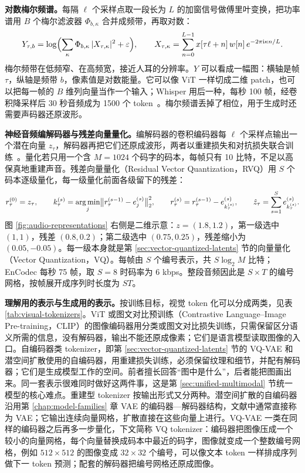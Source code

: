 \textbf{对数梅尔频谱。}每隔 \(\ell\) 个采样点取一段长为 \(L\) 的加窗信号做傅里叶变换，把功率谱用 \(B\) 个梅尔滤波器 \(\Phi_{b,\kappa}\) 合并成频带，再取对数：
\begin{equation}
 Y_{\tau,b}=\log\Bigl(\sum_{\kappa}\Phi_{b,\kappa}\,|X_{\tau,\kappa}|^2+\varepsilon\Bigr),
 \qquad
 X_{\tau,\kappa}=\sum_{n=0}^{L-1}x[\tau\ell+n]\,w[n]\,e^{-2\pi\mathrm i\kappa n/L}.
\end{equation}
梅尔频带在低频窄、在高频宽，接近人耳的分辨率。\(Y\) 可以看成一幅图：横轴是帧 \(\tau\)，纵轴是频带 \(b\)，像素值是对数能量。它可以像 ViT 一样切成二维 patch，也可以把每一帧的 \(B\) 维列向量当作一个输入；Whisper 用后一种，每秒 100 帧，经卷积降采样后 30 秒音频成为 1500 个 token~\cite{radford2023whisper}。梅尔频谱丢掉了相位，用于生成时还需要声码器还原波形。

\textbf{神经音频编解码器与残差向量量化。}编解码器的卷积编码器每 \(\ell\) 个采样点输出一个潜在向量 \(z_\tau\)，解码器再把它们还原成波形，两者以重建损失和对抗损失联合训练~\cite{zeghidour2021soundstream,defossez2022encodec}。量化若只用一个含 \(M=1024\) 个码字的码本，每帧只有 10 比特，不足以高保真地重建声音。残差向量量化（Residual Vector Quantization，RVQ）用 \(S\) 个码本逐级量化，每一级量化前面各级留下的残差：
\begin{equation}
 r^{(0)}_\tau=z_\tau,\qquad
 k^{(s)}_\tau=\operatorname*{arg\,min}_{j}\bigl\|r^{(s-1)}_\tau-e^{(s)}_j\bigr\|_2^2,\qquad
 r^{(s)}_\tau=r^{(s-1)}_\tau-e^{(s)}_{k^{(s)}_\tau},
 \qquad
 \hat z_\tau=\sum_{s=1}^{S}e^{(s)}_{k^{(s)}_\tau}.
 \label{eq:rvq}
\end{equation}
图 \ref{fig:audio-representations} 右侧是二维示意：\(z=(1.8,1.2)\)，第一级选中 \((1,1)\)，残差 \((0.8,0.2)\)；第二级选中 \((0.75,0.25)\)，残差缩小为 \((0.05,-0.05)\)。每一级本身就是第 \ref{sec:vector-quantized-latents} 节的向量量化（Vector Quantization，VQ）。每帧由 \(S\) 个编号表示，共 \(S\log_2M\) 比特；EnCodec 每秒 75 帧，取 \(S=8\) 时码率为 6 kbps。整段音频因此是 \(S\times T\) 的编号网格，按帧展开成序列时长度为 \(ST\)。

\textbf{理解用的表示与生成用的表示。}按训练目标，视觉 token 化可以分成两类，见表 \ref{tab:visual-tokenizers}。ViT 或图文对比预训练（Contrastive Language--Image Pre-training，CLIP）的图像编码器用分类或图文对比损失训练，只需保留区分语义所需的信息，没有解码器，输出不能还原成像素；它们是语言模型读取图像的入口。自编码器类 tokenizer，即第 \ref{sec:vector-quantized-latents} 节的 VQ-VAE 和潜空间扩散使用的自编码器，用重建损失训练，必须保留纹理和细节，并配有解码器；它们是生成模型工作的空间。前者擅长回答“图中是什么”，后者能把图画出来。同一套表示很难同时做好这两件事，这是第 \ref{sec:unified-multimodal} 节统一模型的核心难点。重建型 tokenizer 按输出形式又分两种。潜空间扩散的自编码器沿用第 \ref{chap:model-families} 章 VAE 的编码器—解码器结构，文献中通常直接称为 VAE；它输出连续向量网格，扩散直接在这些向量上进行。VQ-VAE 一类在同样的编码器之后再多一步量化，下文简称 VQ tokenizer：编码器把图像压成一个较小的向量网格，每个向量替换成码本中最近的码字，图像就变成一个整数编号网格，例如 \(512\times512\) 的图像变成 \(32\times32\) 个编号，可以像文本 token 一样排成序列做下一 token 预测；配套的解码器把编号网格还原成图像。

